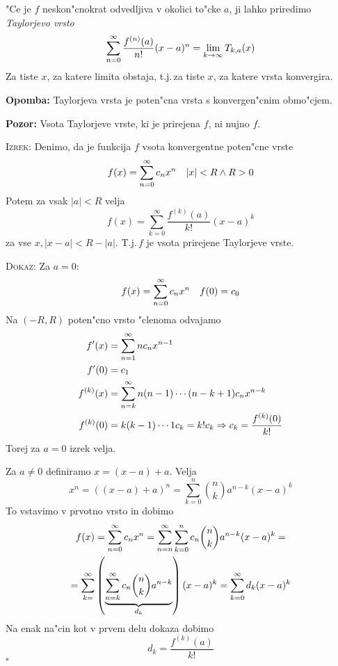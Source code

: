  "Ce je $f$ neskon"cnokrat odvedljiva v okolici to"cke $a$, ji lahko priredimo \emph{Taylorjevo vrsto}
\begin{equation*}
\sum_{n = 0}^{\infty} \dfrac{f^{(n)} (a)}{n!} (x-a)^n = \lim_{k \to \infty} T_{k, a} (x)
\end{equation*}
Za tiste $x$, za katere limita obstaja, t.j.\,za tiste $x$, za katere vrsta konvergira.

\textbf{Opomba:} Taylorjeva vrsta je poten"cna vrsta s konvergen"cnim obmo"cjem.

\textbf{Pozor:} Vsota Taylorjeve vrste, ki je prirejena $f$, ni nujno $f$.

\textsc{Izrek:} Denimo, da je funkcija $f$ vsota konvergentne poten"cne vrste
\begin{equation*}
f(x) = \sum_{n = 0}^{\infty} c_n x^n \quad |x| < R \land R > 0
\end{equation*}
Potem za vsak $|a| < R$ velja
\begin{equation*}
f(x) = \sum_{k=0}^\infty \dfrac{f^{(k)}(a)}{k!} (x - a)^k
\end{equation*}
za vse $x, |x - a| < R - |a|$. T.j.\,$f$ je vsota prirejene Taylorjeve vrste.

\textsc{Dokaz:} Za $a = 0$:
\begin{equation*}
f(x) = \sum_{n = 0}^{\infty} c_n x^n \quad f(0) = c_0
\end{equation*}
Na $(-R, R)$ poten"cno vrsto "clenoma odvajamo
\begin{align*}
f'(x) &= \sum_{n = 1}^{\infty} n c_n x^{n-1} \\
f'(0) &= c_1\\
f^{(k)}(x) &= \sum_{n = k}^{\infty} n(n-1) \cdots (n - k + 1) c_n x^{n-k} \\
f^{(k)}(0) &= k(k-1) \cdots 1 c_k = k! c_k \Rightarrow c_k = \dfrac{f^{(k)}(0)}{k!}
\end{align*}
Torej za $a = 0$ izrek velja.

Za $a \neq 0$ definiramo $x = (x - a) + a$. Velja
\begin{equation*}
x^n = ((x-a) + a)^n = \sum_{k=0}^n \binom{n}{k} a^{n-k} (x-a)^k
\end{equation*}
To vstavimo v prvotno vrsto in dobimo
\begin{multline*}
f(x) = \sum_{n = 0}^{\infty} c_n x^n = \sum_{n = n}^{\infty} \sum_{k=0}^n c_n \binom{n}{k} a^{n-k} (x-a)^k = \\
= \sum_{k=}^\infty \left( \underbrace{\sum_{n = k}^\infty c_n \binom{n}{k} a^{n-k}}_{d_k} \right) (x - a)^k = \sum_{k=0}^\infty d_k (x - a)^k
\end{multline*}
Na enak na"cin kot v prvem delu dokaza dobimo
\begin{equation*}
d_k = \dfrac{f^{(k)}(a)}{k!}
\end{equation*}
\hfill $\square$

